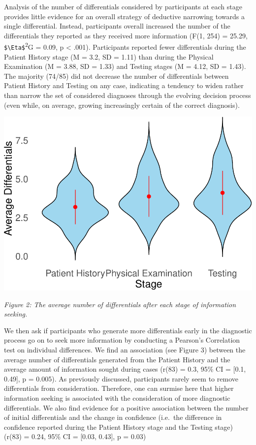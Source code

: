 \documentclass[a4paper, nobind]{templates/ociamthesis}
\begin{document}
Analysis of the number of differentials considered by participants at each stage provides little evidence for an overall strategy of deductive narrowing towards a single differential. Instead, participants overall increased the number of the differentials they reported as they received more information (F(1, 254) = 25.29, \texttt{\$\textbackslash{}Eta\$}\textsuperscript{2}G = 0.09, p \textless{} .001). Participants reported fewer differentials during the Patient History stage (M = 3.2, SD = 1.11) than during the Physical Examination (M = 3.88, SD = 1.33) and Testing stages (M = 4.12, SD = 1.43). The majority (74/85) did not decrease the number of differentials between Patient History and Testing on any case, indicating a tendency to widen rather than narrow the set of considered diagnoses through the evolving decision process (even while, on average, growing increasingly certain of the correct diagnosis).

\begin{center}\includegraphics[width=1\linewidth]{_main_files/figure-latex/diffsOverStages-1} \end{center}

\emph{Figure 2: The average number of differentials after each stage of information seeking.}

We then ask if participants who generate more differentials early in the diagnostic process go on to seek more information by conducting a Pearson's Correlation test on individual differences. We find an association (see Figure 3) between the average number of differentials generated from the Patient History and the average amount of information sought during cases (r(83) = 0.3, 95\% CI = {[}0.1, 0.49{]}, p = 0.005). As previously discussed, participants rarely seem to remove differentials from consideration. Therefore, one can surmise here that higher information seeking is associated with the consideration of more diagnostic differentials. We also find evidence for a positive association between the number of initial differentials and the change in confidence (i.e.~the difference in confidence reported during the Patient History stage and the Testing stage) (r(83) = 0.24, 95\% CI = {[}0.03, 0.43{]}, p = 0.03)
\end{document}
